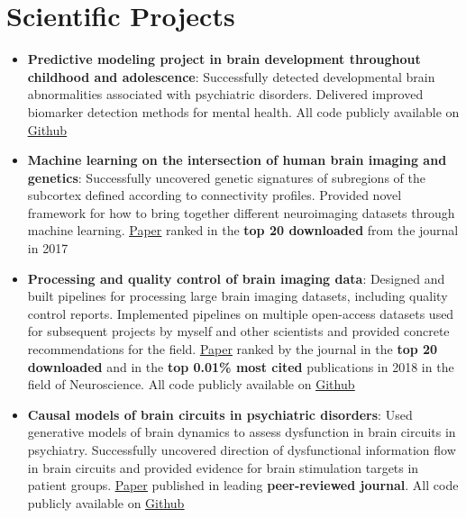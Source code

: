 \documentclass[letterpaper,10pt]{article}
\newcommand{\resumeItem}[2]{
  \item\small{
    \textbf{#1}{: #2 \vspace{-2pt}}
  }
}
\newcommand{\resumeSubItem}[2]{\resumeItem{#1}{#2}\vspace{-4pt}}
\newcommand{\resumeSubHeadingListStart}{\begin{itemize}[leftmargin=*]}
\newcommand{\resumeSubHeadingListEnd}{\end{itemize}}
\begin{document}
\section{Scientific Projects}
  \resumeSubHeadingListStart
    \resumeSubItem{Predictive modeling project in brain development throughout childhood and adolescence}
      {Successfully detected developmental brain abnormalities associated with psychiatric disorders. Delivered improved biomarker detection methods for mental health. All code publicly available on \href{https://github.com/lindenmp/NormativeNeuroDev_CrossSec}{\underline{Github}}}
      \newline
    \resumeSubItem{Machine learning on the intersection of human brain imaging and genetics}
      {Successfully uncovered genetic signatures of subregions of the subcortex defined according to connectivity profiles. Provided novel framework for how to bring together different neuroimaging datasets through machine learning. \href{https://onlinelibrary.wiley.com/doi/full/10.1111/gbb.12386}{\underline{Paper}} ranked in the \textbf{top 20 downloaded} from the journal in 2017}
      \newline
    \resumeSubItem{Processing and quality control of brain imaging data}
      {Designed and built pipelines for processing large brain imaging datasets, including quality control reports. Implemented pipelines on multiple open-access datasets used for subsequent projects by myself and other scientists and provided concrete recommendations for the field. \href{https://www.sciencedirect.com/science/article/pii/S1053811917310972}{\underline{Paper}} ranked by the journal in the \textbf{top 20 downloaded} and in the \textbf{top 0.01\% most cited} publications in 2018 in the field of Neuroscience. All code publicly available on \href{https://github.com/lindenmp/rs-fMRI}{\underline{Github}}}
      \newline
    \resumeSubItem{Causal models of brain circuits in psychiatric disorders}
      {Used generative models of brain dynamics to assess dysfunction in brain circuits in psychiatry. Successfully uncovered direction of dysfunctional information flow in brain circuits and provided evidence for brain stimulation targets in patient groups. \href{https://www.sciencedirect.com/science/article/pii/S1053811919306585}{\underline{Paper}} published in leading \textbf{peer-reviewed journal}. All code publicly available on \href{https://github.com/lindenmp/rs-fMRI/tree/master/stats/spDCM}{\underline{Github}}}
  \resumeSubHeadingListEnd
\end{document}
